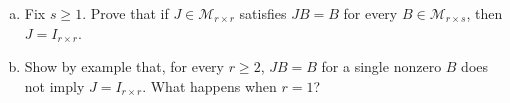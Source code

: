\begin{exercise}
  \label{ex:hw02:characterizing-the-identity}
  \begin{enumerate}[(a)][2]
    \item Fix \(s\ge1\). Prove that if \(J\in\mathcal M_{r\times r}\)
      satisfies \(JB=B\) for every \(B\in\mathcal M_{r\times s}\),
      then \(J=I_{r\times r}\).
    \item Show by example that, for every \(r\ge2\), \(JB=B\) for a
      single nonzero \(B\) does not imply \(J=I_{r\times r}\). What
      happens when \(r=1\)?
  \end{enumerate}
\end{exercise}
